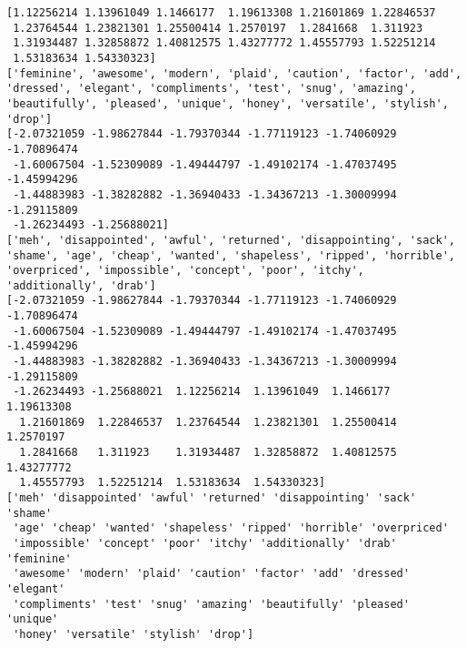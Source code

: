 \documentclass[11pt]{article}
\begin{document}
    \begin{Verbatim}[commandchars=\\\{\}]
[1.12256214 1.13961049 1.1466177  1.19613308 1.21601869 1.22846537
 1.23764544 1.23821301 1.25500414 1.2570197  1.2841668  1.311923
 1.31934487 1.32858872 1.40812575 1.43277772 1.45557793 1.52251214
 1.53183634 1.54330323]
['feminine', 'awesome', 'modern', 'plaid', 'caution', 'factor', 'add', 'dressed', 'elegant', 'compliments', 'test', 'snug', 'amazing', 'beautifully', 'pleased', 'unique', 'honey', 'versatile', 'stylish', 'drop']
[-2.07321059 -1.98627844 -1.79370344 -1.77119123 -1.74060929 -1.70896474
 -1.60067504 -1.52309089 -1.49444797 -1.49102174 -1.47037495 -1.45994296
 -1.44883983 -1.38282882 -1.36940433 -1.34367213 -1.30009994 -1.29115809
 -1.26234493 -1.25688021]
['meh', 'disappointed', 'awful', 'returned', 'disappointing', 'sack', 'shame', 'age', 'cheap', 'wanted', 'shapeless', 'ripped', 'horrible', 'overpriced', 'impossible', 'concept', 'poor', 'itchy', 'additionally', 'drab']
[-2.07321059 -1.98627844 -1.79370344 -1.77119123 -1.74060929 -1.70896474
 -1.60067504 -1.52309089 -1.49444797 -1.49102174 -1.47037495 -1.45994296
 -1.44883983 -1.38282882 -1.36940433 -1.34367213 -1.30009994 -1.29115809
 -1.26234493 -1.25688021  1.12256214  1.13961049  1.1466177   1.19613308
  1.21601869  1.22846537  1.23764544  1.23821301  1.25500414  1.2570197
  1.2841668   1.311923    1.31934487  1.32858872  1.40812575  1.43277772
  1.45557793  1.52251214  1.53183634  1.54330323]
['meh' 'disappointed' 'awful' 'returned' 'disappointing' 'sack' 'shame'
 'age' 'cheap' 'wanted' 'shapeless' 'ripped' 'horrible' 'overpriced'
 'impossible' 'concept' 'poor' 'itchy' 'additionally' 'drab' 'feminine'
 'awesome' 'modern' 'plaid' 'caution' 'factor' 'add' 'dressed' 'elegant'
 'compliments' 'test' 'snug' 'amazing' 'beautifully' 'pleased' 'unique'
 'honey' 'versatile' 'stylish' 'drop']

    \end{Verbatim}

    \begin{center}
    \end{center}
    { \hspace*{\fill} \\}
    
\end{document}
